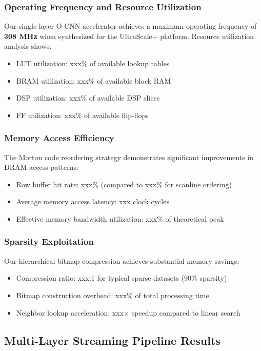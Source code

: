\documentclass[sigconf, screen]{acmart}
\begin{document}
\subsubsection{Operating Frequency and Resource Utilization}
Our single-layer O-CNN accelerator achieves a maximum operating frequency of \textbf{308 MHz} when synthesized for the UltraScale+ platform. Resource utilization
analysis shows:
\begin{itemize}
  \item LUT utilization: xxx\% of available lookup tables
  \item BRAM utilization: xxx\% of available block RAM
  \item DSP utilization: xxx\% of available DSP slices
  \item FF utilization: xxx\% of available flip-flops
\end{itemize}

\subsubsection{Memory Access Efficiency}
The Morton code reordering strategy demonstrates significant improvements in DRAM access patterns:
\begin{itemize}
  \item Row buffer hit rate: xxx\% (compared to xxx\% for scanline ordering)
  \item Average memory access latency: xxx clock cycles
  \item Effective memory bandwidth utilization: xxx\% of theoretical peak
\end{itemize}

\subsubsection{Sparsity Exploitation}
Our hierarchical bitmap compression achieves substantial memory savings:
\begin{itemize}
  \item Compression ratio: xxx:1 for typical sparse datasets (90\% sparsity)
  \item Bitmap construction overhead: xxx\% of total processing time
  \item Neighbor lookup acceleration: xxx× speedup compared to linear search
\end{itemize}

\subsection{Multi-Layer Streaming Pipeline Results}
\end{document}
